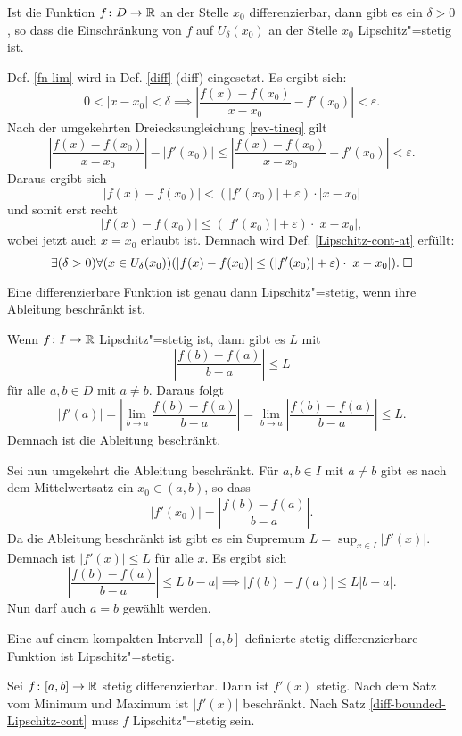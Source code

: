 \begin{Satz}\label{diff-nh-Lipschitz-cont-at}
Ist die Funktion $f\colon D\to\mathbb R$ an der Stelle $x_0$ differenzierbar,
dann gibt es ein $\delta>0$, so dass die Einschränkung von $f$
auf $U_\delta(x_0)$ an der Stelle $x_0$ Lipschitz"=stetig ist.
\end{Satz}

\begin{Beweis}
Def. \ref{fn-lim} wird in Def. \ref{diff} (diff) eingesetzt.
Es ergibt sich:
\[0<|x-x_0|<\delta\implies
\left|\frac{f(x)-f(x_0)}{x-x_0}-f'(x_0)\right|<\varepsilon.\]
Nach der umgekehrten Dreiecksungleichung \ref{rev-tineq} gilt
\[\left|\frac{f(x)-f(x_0)}{x-x_0}\right|-|f'(x_0)| \le
\left|\frac{f(x)-f(x_0)}{x-x_0}-f'(x_0)\right|
< \varepsilon.\]
Daraus ergibt sich
\[|f(x)-f(x_0)| < (|f'(x_0)|+\varepsilon)\cdot |x-x_0|\]
und somit erst recht
\[|f(x)-f(x_0)| \le (|f'(x_0)|+\varepsilon)\cdot |x-x_0|,\]
wobei jetzt auch $x=x_0$ erlaubt ist. Demnach wird Def.
\ref{Lipschitz-cont-at} erfüllt:
\[\exists(\delta>0)\forall(x\in U_\delta(x_0))(
|f(x)-f(x_0)| \le (|f'(x_0)|+\varepsilon)\cdot |x-x_0|).\;\square\]
\end{Beweis}

\begin{Satz}\label{diff-bounded-Lipschitz-cont}
Eine differenzierbare Funktion ist genau dann Lipschitz"=stetig,
wenn ihre Ableitung beschränkt ist.
\end{Satz}
\begin{Beweis}
Wenn $f\colon I\to\mathbb R$ Lipschitz"=stetig ist, dann gibt es $L$ mit
\[\left|\frac{f(b)-f(a)}{b-a}\right|\le L\]
für alle $a,b\in D$ mit $a\ne b$. Daraus folgt
\[|f'(a)| = \left|\lim_{b\to a} \frac{f(b)-f(a)}{b-a}\right|
= \lim_{b\to a} \left|\frac{f(b)-f(a)}{b-a}\right|
\le L.\]
Demnach ist die Ableitung beschränkt.

Sei nun umgekehrt die Ableitung beschränkt. Für $a,b\in I$ mit $a\ne b$
gibt es nach dem Mittelwertsatz ein $x_0\in(a,b)$, so dass
\[|f'(x_0)| = \left|\frac{f(b)-f(a)}{b-a}\right|.\]
Da die Ableitung beschränkt ist gibt es ein Supremum
$L = \sup_{x\in I} |f'(x)|$. Demnach ist $|f'(x)|\le L$ für alle $x$.
Es ergibt sich
\[\left|\frac{f(b)-f(a)}{b-a}\right|\le L|b-a| \implies |f(b)-f(a)|\le L|b-a|.\]
Nun darf auch $a=b$ gewählt werden.\;\qedsymbol
\end{Beweis}

\begin{Satz}\label{diff-compact-Lipschitz-cont}
Eine auf einem kompakten Intervall $[a,b]$ definierte stetig
differenzierbare Funktion ist Lipschitz"=stetig.
\end{Satz}
\begin{Beweis}
Sei $f\colon [a,b]\to\mathbb R$ stetig differenzierbar. Dann ist $f'(x)$ stetig.
Nach dem Satz vom Minimum und Maximum ist $|f'(x)|$ beschränkt. Nach
Satz \ref{diff-bounded-Lipschitz-cont} muss $f$ Lipschitz"=stetig
sein.\;\qedsymbol
\end{Beweis}

